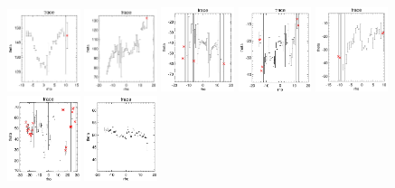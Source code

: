 \documentclass[fleqn,usenatbib]{mnras}
\begin{document}
\begin{figure}
    \includegraphics[width=0.19\textwidth]{Images/trace-plots/trace-plots-cpsbs/8979-1902.png}
    \includegraphics[width=0.19\textwidth]{Images/trace-plots/trace-plots-cpsbs/8996-3704.png}
    \includegraphics[width=0.19\textwidth]{Images/trace-plots/trace-plots-cpsbs/8997-3704.png}
    \includegraphics[width=0.19\textwidth]{Images/trace-plots/trace-plots-cpsbs/9047-3701.png}
    \includegraphics[width=0.19\textwidth]{Images/trace-plots/trace-plots-cpsbs/9085-1902.png}
    \includegraphics[width=0.19\textwidth]{Images/trace-plots/trace-plots-cpsbs/9493-12705.png}
    \includegraphics[width=0.19\textwidth]{Images/trace-plots/trace-plots-cpsbs/9494-3701.png}

\end{figure}
\end{document}
